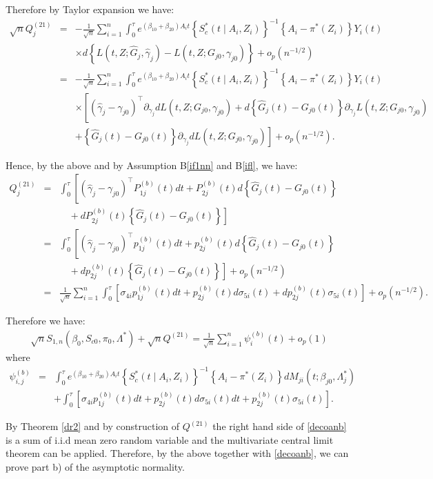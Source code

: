 \documentclass[11pt]{article}
\newcommand{\ee}{\end{eqnarray}}
\newcommand{\eqnn}{\begin{eqnarray*}}
\newcommand{\een}{\end{eqnarray*}}
\newcommand{\be}{\begin{eqnarray}}
\begin{document}
Therefore by Taylor expansion we have:
\eqnn
\sqrt{n}Q^{(21)}_j&=&-\frac{1}{\sqrt{n}}\sum_{i=1}^n\int_0^\tau e^{ (\beta_{10}  + \beta_{20}) A_i t} \left\{S^{*}_c(t \mid A_i,Z_i)\right\}^{-1}\left\{A_i -\pi^{*}( Z_i)\right\}Y_i(t)\\&&\times d\left\{L(t,Z; \hat G_{j}, \hat \gamma_j)-L(t,Z; G_{j0}, \gamma_{j0})\right\}+o_p(n^{-1/2})\nonumber\\
&=&-\frac{1}{\sqrt{n}}\sum_{i=1}^n\int_0^\tau e^{ (\beta_{10}  + \beta_{20}) A_i t} \left\{S^{*}_c(t \mid A_i,Z_i)\right\}^{-1}\left\{A_i -\pi^{*}( Z_i)\right\}Y_i(t)\\&&\times \left[(\hat\gamma_j-\gamma_{j0})^\top\partial_{\gamma_j}dL(t, Z ; G_{j0}, \gamma_{j0})  +d\left\{\hat G_j(t)-G_{j0}(t)\right\}\partial_{\gamma_j}L(t, Z ; G_{j0}, \gamma_{j0})\right.\\&&\left.+\left\{\hat G_j(t)-G_{j0}(t)\right\}\partial_{\gamma_j}dL(t, Z ; G_{j0}, \gamma_{j0})\right]+o_p(n^{-1/2}).
\een

Hence, by the above and by Assumption B\ref{if1nn} and B\ref{ifl}, we have:
\be%
Q^{(21)}_j&=&\int_0^\tau \left[(\hat\gamma_j-\gamma_{j0})^\top P^{(b)}_{1j}(t)dt +P^{(b)}_{2j}(t)d\left\{\hat G_j(t)-G_{j0}(t)\right\}\right.
\\
&&\left.\quad
+dP^{(b)}_{2j}(t)\left\{\hat G_j(t)-G_{j0}(t)\right\}\right]\nonumber\\
&=&\int_0^\tau \left[(\hat\gamma_j-\gamma_{j0})^\top p^{(b)}_{1j}(t)dt +p^{(b)}_{2j}(t)d\left\{\hat G_j(t)-G_{j0}(t)\right\}\right.
\nonumber\\
&&\left.\quad +dp^{(b)}_{2j}(t)\left\{\hat G_j(t)-G_{j0}(t)\right\}\right]+o_p(n^{-1/2})\nonumber\\
&=&\frac{1}{\sqrt{n}}\sum_{i=1}^n\int_0^\tau \left[ \sigma_{4i} p^{(b)}_{1j}(t)dt +p^{(b)}_{2j}(t)d\sigma_{5i}(t)+dp^{(b)}_{2j}(t)\sigma_{5i}(t)\right]+o_p(n^{-1/2}).\nonumber
\ee

Therefore we have:
\be\label{anpswnb}
\sqrt{n}{S}_{1,n}(\beta_0, S_{c0},  \pi_0,  \Lambda^{*})+\sqrt{n}{Q}^{(21)}=\frac{1}{\sqrt{n}}\sum_{i=1}^n \psi^{(b)}_i(t)+o_p(1)
\ee
where
\eqnn
\psi^{(b)}_{i,j}&=&\int_0^\tau e^{ (\beta_{10}  + \beta_{20}) A_i t} \left\{S^{*}_{c}(t \mid A_i,Z_i)\right\}^{-1}\left\{A_i -\pi^{*}(Z_i)\right\}dM_{ji}(t; \beta_{j0},\Lambda^{*}_j)\\&&+\int_0^\tau \left[ \sigma_{4i} p^{(b)}_{1j}(t)dt +p^{(b)}_{2j}(t)d\sigma_{5i}(t)dt+p^{(b)}_{2j}(t)\sigma_{5i}(t)\right].\een

By Theorem \ref{dr2} and by construction of $Q^{(21)}$ the right hand side of \eqref{decoanb} is a sum of i.i.d mean zero random variable and the multivariate central limit theorem can be applied.
Therefore, by the above together with \eqref{decoanb}, we can prove part b) of the asymptotic normality. 
\end{document}
